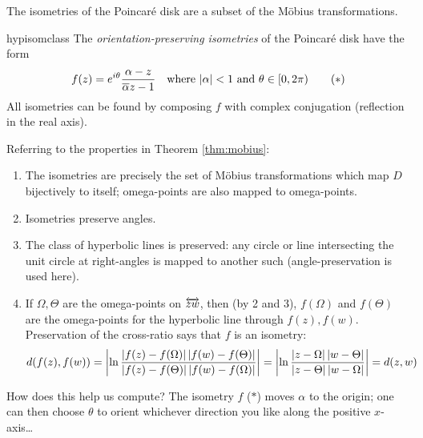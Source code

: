 

\goodbreak

The isometries of the Poincaré disk are a subset of the Möbius transformations.

\begin{thm}{}{hypisomclass}
	The \emph{orientation-preserving\footnotemark{} isometries} of the Poincaré disk have the form
	\[
		f(z)=e^{i\theta}\frac{\alpha-z}{\overline{\alpha} z-1}\quad\text{where $\left| \alpha\right|<1$ and $\theta\in[0,2\pi)$}\tag{$\ast$}
	\]
	All isometries can be found by composing $f$ with complex conjugation (reflection in the real axis).
\end{thm}



Referring to the properties in Theorem \ref{thm:mobius}:
\begin{enumerate}\itemsep0pt
  \item The isometries are precisely the set of Möbius transformations which map $D$ bijectively to itself; omega-points are also mapped to omega-points.
  \item Isometries preserve angles.
  \item The class of hyperbolic lines is preserved: any circle or line intersecting the unit circle at right-angles is mapped to another such (angle-preservation is used here). 
  \item If $\Omega,\Theta$ are the omega-points on $\overleftrightarrow{zw}$, then (by 2 and 3), $f(\Omega)$ and $f(\Theta)$ are the omega-points for the hyperbolic line through $f(z),f(w)$. Preservation of the cross-ratio says that $f$ is an isometry:
  \[
  	d(f(z),f(w))=\left| \ln\frac{\left| f(z)-f(\Omega)\right|\left| f(w)-f(\Theta)\right|}{\left| f(z)-f(\Theta)\right|\left| f(w)-f(\Omega)\right|}\right|= \left| \ln\frac{\left| z-\Omega\right|\left| w-\Theta\right|}{\left| z-\Theta\right|\left| w-\Omega\right|}\right|=d(z,w)
  \]
\end{enumerate}

How does this help us compute? The isometry $f$ ($\ast$) moves $\alpha$ to the origin; one can then choose $\theta$ to orient whichever direction you like along the positive $x$-axis\ldots



